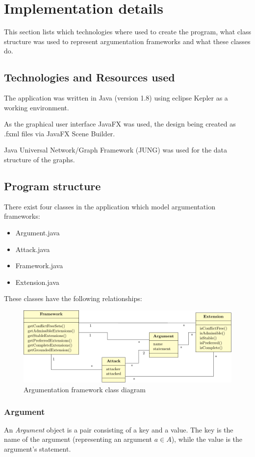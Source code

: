 \documentclass[draft,final]{vutinfth} %
\newcommand{\hl}{\par\vspace{6pt}} %
\newcommand{\cl}{\par\vspace{12pt}} %
\begin{document}
\section{Implementation details}
This section lists which technologies where used to create the program, what class structure was used to represent argumentation frameworks and what these classes do.\cl

\subsection{Technologies and Resources used}
The application was written in Java (version 1.8) using eclipse Kepler as a working environment.\hl
As the graphical user interface JavaFX was used, the design being created as .fxml files via JavaFX Scene Builder.\hl
Java Universal Network/Graph Framework (JUNG) was used for the data structure of the graphs.

\subsection{Program structure}
There exist four classes in the application which model argumentation frameworks:

\begin{itemize}[noitemsep]
	\item Argument.java
	\item Attack.java
	\item Framework.java
	\item Extension.java
\end{itemize}

These classes have the following relationships:

\FloatBarrier
\begin{figure}[!h]
	\centering
	\includegraphics[width=\linewidth]{graphs/classes.pdf}
	\caption{Argumentation framework class diagram}
\end{figure}
\FloatBarrier

\subsubsection{Argument}
An \emph{Argument} object is a pair consisting of a key and a value. The key is the name of the argument (representing an argument $a\in A$), while the value is the argument's statement.\hl
\end{document}
